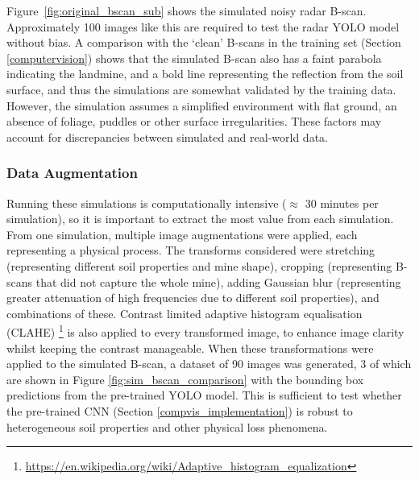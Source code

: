         \noindent Figure~\ref{fig:original_bscan_sub} shows the simulated noisy radar B-scan. Approximately 100 images like this are required to test the radar YOLO model without bias. A comparison with the `clean' B-scans in the training set (Section \ref{computervision}) shows that the simulated B-scan also has a faint parabola indicating the landmine, and a bold line representing the reflection from the soil surface, and thus the simulations are somewhat validated by the training data. However, the simulation assumes a simplified environment with flat ground, an absence of foliage, puddles or other surface irregularities. These factors may account for discrepancies between simulated and real-world data.

    
    \subsubsection{Data Augmentation}

      Running these simulations is computationally intensive (\(\approx\) 30 minutes per simulation), so it is important to extract the most value from each simulation. From one simulation, multiple image augmentations were applied, each representing a physical process. The transforms considered were stretching (representing different soil properties and mine shape), cropping (representing B-scans that did not capture the whole mine), adding Gaussian blur (representing greater attenuation of high frequencies due to different soil properties), and combinations of these. Contrast limited adaptive histogram equalisation (CLAHE) \footnote{\url{https://en.wikipedia.org/wiki/Adaptive_histogram_equalization}} is also applied to every transformed image, to enhance image clarity whilst keeping the contrast manageable. When these transformations were applied to the simulated B-scan, a dataset of 90 images was generated, 3 of which are shown in Figure \ref{fig:sim_bscan_comparison} with the bounding box predictions from the pre-trained YOLO model. This is sufficient to test whether the pre-trained CNN (Section \ref{compvis_implementation}) is robust to heterogeneous soil properties and other physical loss phenomena.

